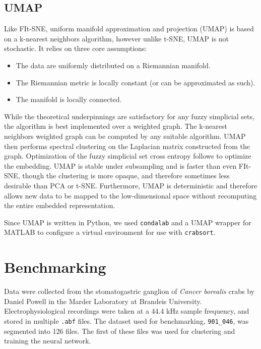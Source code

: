 \documentclass{article}
\begin{document}
\subsection{UMAP}

Like FIt-SNE, uniform manifold approximation and projection (UMAP) \autocite{mcinnesUMAPUniformManifold2018}
is based on a k-nearest neighbors algorithm, however unlike t-SNE, UMAP is not stochastic.
It relies on three core assumptions:

\begin{itemize}
  \item The data are uniformly distributed on a Riemannian manifold.
  \item The Riemannian metric is locally constant (or can be approximated as such).
  \item The manifold is locally connected.
\end{itemize}

While the theoretical underpinnings are satisfactory for any fuzzy simplicial sets,
the algorithm is best implemented over a weighted graph.
The k-nearest neighbors weighted graph can be computed by any suitable algorithm.
UMAP then performs spectral clustering on the Laplacian matrix constructed from the graph.
Optimization of the fuzzy simplicial set cross entropy follows to optimize the embedding.
UMAP is stable under subsampling and is faster than even FIt-SNE,
though the clustering is more opaque, and therefore sometimes less desirable than PCA or t-SNE.
Furthermore, UMAP is deterministic and therefore allows new data to be mapped to the low-dimensional space
without recomputing the entire embedded representation.

Since UMAP is written in Python, we used \texttt{condalab} and a UMAP wrapper for MATLAB
to configure a virtual environment for use with \texttt{crabsort}.

\section{Benchmarking}

Data were collected from the stomatogastric ganglion of \textit{Cancer borealis} crabs
by Daniel Powell in the Marder Laboratory at Brandeis University.
Electrophysiological recordings were taken at a 44.4 kHz sample frequency,
and stored in multiple \texttt{.abf} files.
The dataset used for benchmarking, \texttt{901\_046}, was segmented into 126 files.
The first of these files was used for clustering and training the neural network.
\end{document}
